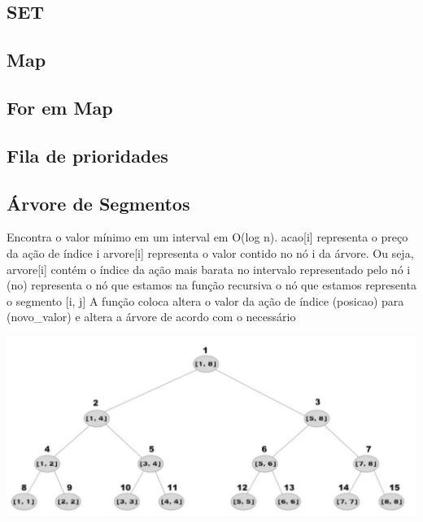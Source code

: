 \documentclass[a4paper,12pt]{article}
\begin{document}
\subsection{SET}

\subsection{Map}

\subsection{For em Map}

\subsection{Fila de prioridades}

\subsection{Árvore de Segmentos}
\indent Encontra o valor mínimo em um interval em O(log n).
acao[i] representa o preço da ação de índice i
arvore[i] representa o valor contido no nó i da árvore.
\newline Ou seja, arvore[i] contém o índice da ação mais barata
no intervalo representado pelo nó i
(no) representa o nó que estamos na função recursiva o nó que estamos representa o segmento [i, j]
\newline A função coloca altera o valor da ação de índice (posicao) para (novo\_valor) e altera a árvore de acordo com o necessário
\begin{center}
  \includegraphics[width=\linewidth]{figures/estruturas/arvore_de_segmentos.png}
\end{center}
\end{document}
